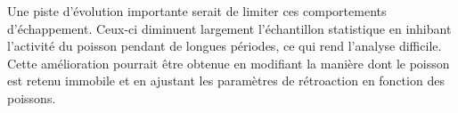 Une piste d'évolution importante serait de limiter ces comportements d'échappement. 
Ceux-ci diminuent largement l'échantillon statistique en inhibant l'activité du poisson pendant de longues périodes, ce qui rend l'analyse difficile. Cette amélioration pourrait être obtenue en modifiant la manière dont le poisson est retenu immobile et en ajustant les paramètres de rétroaction en fonction des poissons. 